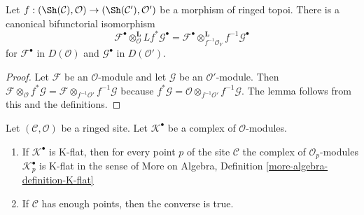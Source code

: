 \begin{lemma}
\label{lemma-variant-derived-pullback}
Let $f : (\Sh(\mathcal{C}), \mathcal{O}) \to (\Sh(\mathcal{C}'), \mathcal{O}')$
be a morphism of ringed topoi. There is a canonical bifunctorial
isomorphism
$$
\mathcal{F}^\bullet
\otimes_\mathcal{O}^{\mathbf{L}}
Lf^*\mathcal{G}^\bullet
=
\mathcal{F}^\bullet 
\otimes_{f^{-1}\mathcal{O}_Y}^{\mathbf{L}}
f^{-1}\mathcal{G}^\bullet 
$$
for $\mathcal{F}^\bullet$ in $D(\mathcal{O})$ and
$\mathcal{G}^\bullet$ in $D(\mathcal{O}')$.
\end{lemma}

\begin{proof}
Let $\mathcal{F}$ be an $\mathcal{O}$-module and let $\mathcal{G}$
be an $\mathcal{O}'$-module. Then
$\mathcal{F} \otimes_{\mathcal{O}} f^*\mathcal{G} =
\mathcal{F} \otimes_{f^{-1}\mathcal{O}'} f^{-1}\mathcal{G}$
because
$f^*\mathcal{G} =
\mathcal{O} \otimes_{f^{-1}\mathcal{O}'} f^{-1}\mathcal{G}$.
The lemma follows from this and the definitions.
\end{proof}











\begin{lemma}
\label{lemma-check-K-flat-stalks}
Let $(\mathcal{C}, \mathcal{O})$ be a ringed site.
Let $\mathcal{K}^\bullet$ be a complex of $\mathcal{O}$-modules.
\begin{enumerate}
\item If $\mathcal{K}^\bullet$ is K-flat, then for every point $p$
of the site $\mathcal{C}$ the complex of $\mathcal{O}_p$-modules
$\mathcal{K}_p^\bullet$ is K-flat in the sense of
More on Algebra, Definition \ref{more-algebra-definition-K-flat}
\item If $\mathcal{C}$ has enough points, then the converse is true.
\end{enumerate}
\end{lemma}

